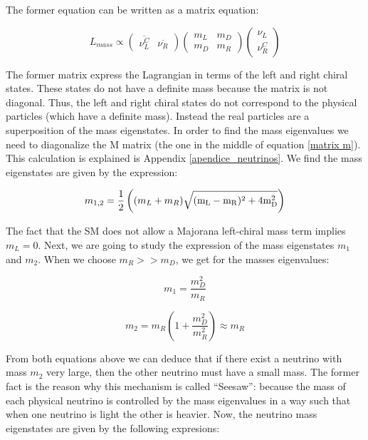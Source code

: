 The former equation can be written as a matrix equation: 

\begin{equation}\label{matrix m}
L_{mass} \propto
\begin{pmatrix} 
  \overline{\nu_L^C} & \overline{\nu_R}
\end{pmatrix}
\begin{pmatrix}
  m_L & m_D \\
  m_D & m_R  
\end{pmatrix}
\begin{pmatrix}
  \nu_L \\
  \nu_R^C  
\end{pmatrix}
\end{equation}

The former matrix express the Lagrangian in terms of the left and right chiral states. These states do not have a definite mass because the matrix is not diagonal. 
Thus, the left and right chiral states do not correspond to the physical particles (which have a definite mass). Instead the real particles are a superposition of the 
mass eigenstates. In order to find the mass eigenvalues we need to diagonalize the M matrix (the one in the middle of equation \ref{matrix m}). This calculation is 
explained is Appendix \ref{apendice_neutrinos}. We find the mass eigenstates are given by the expression:

\begin{equation}
m_{1,2} = \frac{1}{2} \left( (m_L + m_R) \rm \sqrt{(m_L - m_R)^2 + 4m_D^2} \right)
\end{equation}
 
The fact that the SM does not allow a Majorana left-chiral mass term implies $m_L = 0$. Next, we are going to study the expression of the mass eigenstates $m_1$ and $m_2$. 
When we choose $m_R >> m_D$, we get for the masses eigenvalues:

\begin{equation}
m_1 = \frac{m_D^2}{m_R}
\end{equation}

\begin{equation}
m_2 = m_R \left( 1 + \frac{m_D^2}{m_R^2}\right) \approx m_R 
\end{equation}
 
From both equations above we can deduce that if there exist a neutrino with mass $m_2$ very large, then the other neutrino must have a small mass. The former fact is the 
reason why this mechanism is called ``Seesaw'': because the mass of each physical neutrino is controlled by the mass eigenvalues in a way such that when one neutrino is light
the other is heavier. Now, the neutrino mass eigenstates are given by the following expresions:

